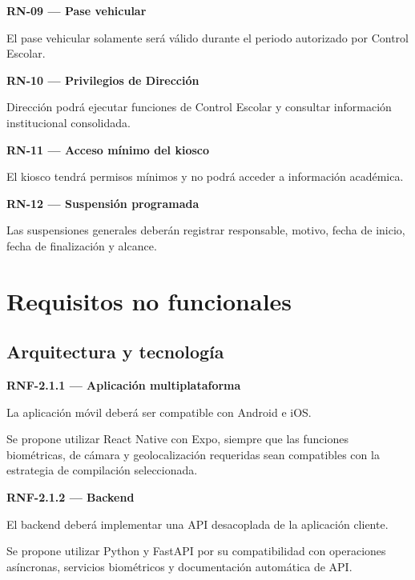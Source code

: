 \documentclass[12pt,a4paper]{article}
\newcommand{\RNF}[1]{\textbf{\color{secondary}RNF-#1}}
\newcommand{\RN}[1]{\textbf{\color{darkgray}RN-#1}}
\newenvironment{requisito}[1]
{
\begin{center}
\begin{minipage}{0.96\textwidth}
\colorbox{requirement}{
\begin{minipage}{0.94\textwidth}
\textbf{#1}
\end{minipage}
}
\vspace{2mm}
}
{
\end{minipage}
\end{center}
}
\begin{document}
\begin{requisito}{\RN{09} --- Pase vehicular}
El pase vehicular solamente será válido durante el periodo autorizado por
Control Escolar.
\end{requisito}

\begin{requisito}{\RN{10} --- Privilegios de Dirección}
Dirección podrá ejecutar funciones de Control Escolar y consultar información
institucional consolidada.
\end{requisito}

\begin{requisito}{\RN{11} --- Acceso mínimo del kiosco}
El kiosco tendrá permisos mínimos y no podrá acceder a información académica.
\end{requisito}

\begin{requisito}{\RN{12} --- Suspensión programada}
Las suspensiones generales deberán registrar responsable, motivo, fecha de inicio,
fecha de finalización y alcance.
\end{requisito}

\section{Requisitos no funcionales}

\subsection{Arquitectura y tecnología}

\begin{requisito}{\RNF{2.1.1} --- Aplicación multiplataforma}
La aplicación móvil deberá ser compatible con Android e iOS.

Se propone utilizar React Native con Expo, siempre que las funciones biométricas,
de cámara y geolocalización requeridas sean compatibles con la estrategia de
compilación seleccionada.
\end{requisito}

\begin{requisito}{\RNF{2.1.2} --- Backend}
El backend deberá implementar una API desacoplada de la aplicación cliente.

Se propone utilizar Python y FastAPI por su compatibilidad con operaciones
asíncronas, servicios biométricos y documentación automática de API.
\end{requisito}
\end{document}
